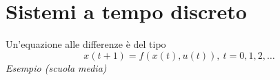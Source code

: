 \section{Sistemi a tempo discreto}

Un'equazione alle differenze è del tipo
\begin{equation*}
	x(t+1) =f(x(t) ,u(t)) ,\ t=0,1,2,\dotsc 
\end{equation*}
\textit{Esempio (scuola media)}

\begin{figure}[htpb]\centering



\begin{tikzpicture}[x=0.75pt,y=0.75pt,yscale=-1,xscale=1]


\end{tikzpicture}
\end{figure}
